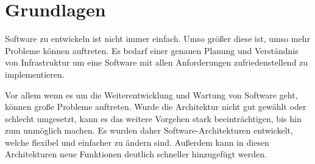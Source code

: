 \chapter{Grundlagen}
\label{chap:grundlagen}
Software zu entwickeln ist nicht immer einfach. Umso größer diese ist, umso mehr Probleme können auftreten. Es bedarf einer genauen Planung und Verständnis von Infrastruktur um eine Software mit allen Anforderungen zufriedenstellend zu implementieren. 

Vor allem wenn es um die Weiterentwicklung und Wartung von Software geht, können große Probleme auftreten. Wurde die Architektur nicht gut gewählt oder schlecht umgesetzt, kann es das weitere Vorgehen stark beeinträchtigen, bis hin zum unmöglich machen. Es wurden daher Software-Architekturen entwickelt, welche flexibel und einfacher zu ändern sind. Außerdem kann in diesen Architekturen neue Funktionen deutlich schneller hinzugefügt werden.

